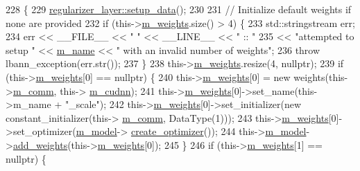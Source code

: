 \begin{DoxyCode}
228                              \{
229     \hyperlink{classlbann_1_1Layer_a50a89f8a68762c677d48efe384676e81}{regularizer\_layer::setup\_data}();
230 
231     \textcolor{comment}{// Initialize default weights if none are provided}
232     \textcolor{keywordflow}{if} (this->\hyperlink{classlbann_1_1Layer_a7954e30fbf9100a6ba4b56d02767a469}{m\_weights}.size() > 4) \{
233       std::stringstream err;
234       err << \_\_FILE\_\_ << \textcolor{stringliteral}{" "} << \_\_LINE\_\_ << \textcolor{stringliteral}{" :: "}
235           << \textcolor{stringliteral}{"attempted to setup "} << \hyperlink{classlbann_1_1Layer_aa47109ad09b399142fa92f9d3702189f}{m\_name} << \textcolor{stringliteral}{" with an invalid number of weights"};
236       \textcolor{keywordflow}{throw} lbann\_exception(err.str());
237     \}
238     this->\hyperlink{classlbann_1_1Layer_a7954e30fbf9100a6ba4b56d02767a469}{m\_weights}.resize(4, \textcolor{keyword}{nullptr});
239     \textcolor{keywordflow}{if} (this->\hyperlink{classlbann_1_1Layer_a7954e30fbf9100a6ba4b56d02767a469}{m\_weights}[0] == \textcolor{keyword}{nullptr}) \{
240       this->\hyperlink{classlbann_1_1Layer_a7954e30fbf9100a6ba4b56d02767a469}{m\_weights}[0] = \textcolor{keyword}{new} weights(this->\hyperlink{classlbann_1_1Layer_a5de05c52f22e0bbd7c703bec3ad4dbf2}{m\_comm}, this->
      \hyperlink{classlbann_1_1Layer_a08dbb94239e3b8c96329786c57c72e21}{m\_cudnn});
241       this->\hyperlink{classlbann_1_1Layer_a7954e30fbf9100a6ba4b56d02767a469}{m\_weights}[0]->set\_name(this->m\_name + \textcolor{stringliteral}{"\_scale"});
242       this->\hyperlink{classlbann_1_1Layer_a7954e30fbf9100a6ba4b56d02767a469}{m\_weights}[0]->set\_initializer(\textcolor{keyword}{new} constant\_initializer(this->
      \hyperlink{classlbann_1_1Layer_a5de05c52f22e0bbd7c703bec3ad4dbf2}{m\_comm}, DataType(1)));
243       this->\hyperlink{classlbann_1_1Layer_a7954e30fbf9100a6ba4b56d02767a469}{m\_weights}[0]->set\_optimizer(\hyperlink{classlbann_1_1Layer_a3d9315e99574166f2f33e37b572021d2}{m\_model}->
      \hyperlink{classlbann_1_1model_a0d2d5a1eac592e5721a81a9b9ea4b7f2}{create\_optimizer}());
244       this->\hyperlink{classlbann_1_1Layer_a3d9315e99574166f2f33e37b572021d2}{m\_model}->\hyperlink{classlbann_1_1model_af35fca77e75eb6dd570e4727aa3d5b6b}{add\_weights}(this->\hyperlink{classlbann_1_1Layer_a7954e30fbf9100a6ba4b56d02767a469}{m\_weights}[0]);
245     \}
246     \textcolor{keywordflow}{if} (this->\hyperlink{classlbann_1_1Layer_a7954e30fbf9100a6ba4b56d02767a469}{m\_weights}[1] == \textcolor{keyword}{nullptr}) \{

\end{DoxyCode}
